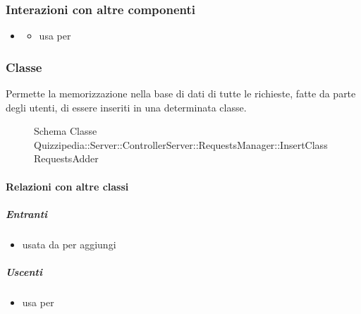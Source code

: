 \subsubsection{Interazioni con altre componenti}
\begin{itemize}
\item {}
\begin{itemize}
\item usa  per 
\end{itemize}
\end{itemize}
\subsubsection{Classe }
Permette la memorizzazione nella base di dati di tutte le richieste, fatte da parte degli utenti, di essere inseriti in una determinata classe.
\begin{figure}[H]
\centering
\noindent{}
\caption[Schema Classe InsertClassRequestsAdder]{Schema Classe Quizzipedia::Server::ControllerServer::RequestsManager::InsertClassRequestsAdder}
\end{figure}
\paragraph{Relazioni con altre classi}
\subparagraph{Entranti}
\begin{itemize}
\item usata da  per aggiungi
\end{itemize}
\subparagraph{Uscenti}
\begin{itemize}
\item usa  per 
\end{itemize}
